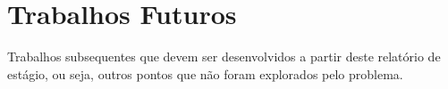 

\section{Trabalhos Futuros}
    \label{sec:trabalhos-futuros}
    Trabalhos subsequentes que devem ser desenvolvidos a partir deste relatório de estágio, ou seja, outros pontos que não foram explorados pelo problema.